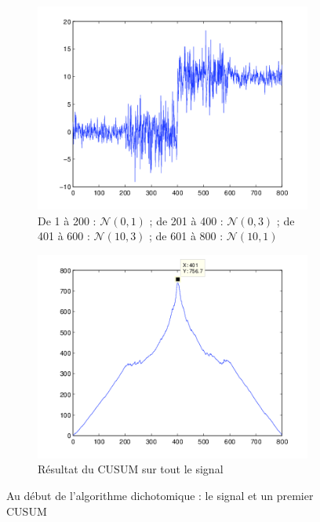 \documentclass[french,11pt,notitlepage]{report}
\begin{document}
	\begin{figure}[hp]
		\begin{subfigure}[t]{.49\textwidth}
			\includegraphics[width=\linewidth,height=.24\textheight]{test_multi_mid}
			\caption{De 1 à 200 : $\mathcal{N}(0,1)$ ; de 201 à 400 : $\mathcal{N}(0,3)$ ; de 401 à 600 : $\mathcal{N}(10,3)$ ; de 601 à 800 : $\mathcal{N}(10,1)$}
			\label{test_multi_dikt}
		\end{subfigure}
		\hfill
		\begin{subfigure}[t]{.49\textwidth}
		  \includegraphics[width=\linewidth,height=.24\textheight]{mle1}
			\caption{Résultat du CUSUM sur tout le signal}
			\label{mle1}
		\end{subfigure}	
	\caption{Au début de l'algorithme dichotomique : le signal et un premier CUSUM}
	\label{testdikt1}
	\end{figure}
	
\end{document}
